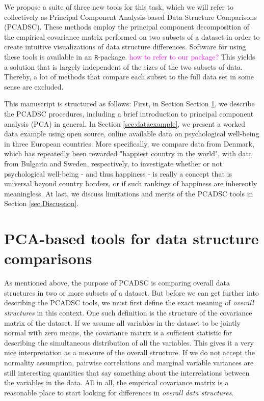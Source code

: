 \documentclass[titlepage,11pt,twoside]{article}
\newcommand{\hl}[1]{\textcolor{magenta}{#1}}
\begin{document}
We propose a suite of three new tools for this task, which we will refer to collectively as Principal Component Analysis-based Data Structure Comparisons (PCADSC). These methods employ the principal component decomposition of the empirical covariance matrix performed on two subsets of a dataset in order to create intuitive visualizations of data structure differences. Software for using these tools is available in an \texttt{R}-package. \hl{how to refer to our package?} This yields a solution that is largely independent of the sizes of the two subsets of data. Thereby, a lot of methods that compare each subset to the full data set in some sense are excluded.

This manuscript is structured as follows: First, in Section Section \ref{sec:pcadscintro}, we describe the PCADSC procedures, including a brief introduction to principal component analysis (PCA) in general. In Section \ref{sec:dataexample}, we present a worked data example using open source, online available data on psychological well-being in three European countries. More specifically, we compare data from Denmark, which has repeatedly been rewarded "happiest country in the world", with data from Bulgaria and Sweden, respectively, to investigate whether or not psychological well-being - and thus happiness - is really a concept that is universal beyond country borders, or if such rankings of happiness are inherently meaningless. At last, we discuss limitations and merits of the PCADSC tools in Section \ref{sec.Discussion}.





\section{PCA-based tools for data structure comparisons}
\label{sec:pcadscintro}
As mentioned above, the purpose of PCADSC is comparing overall data structures in two or more subsets of a dataset. But before we can get further into describing the PCADSC tools, we must first define the exact meaning of \textit{overall structures} in this context. One such definition is the structure of the covariance matrix of the dataset. If we assume all variables in the dataset to be jointly normal with zero means, the covariance matrix is a sufficient statistic for describing the simultaneous distribution of all the variables. This gives it a very nice interpretation as a measure of the overall structure. If we do not accept the normality assumption, pairwise correlations and marginal variable variances are still interesting quantities that say something about the interrelations between the variables in the data. All in all, the empirical covariance matrix is a reasonable place to start looking for differences in \textit{overall data structures}.
\end{document}
